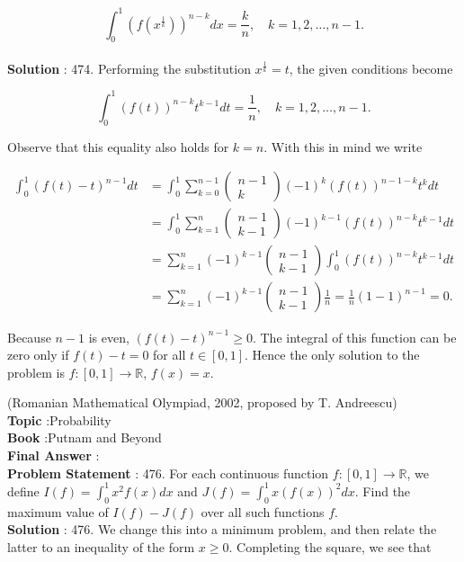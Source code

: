 \documentclass[10pt]{article}
\begin{document}
$$
\int_{0}^{1}\left(f\left(x^{\frac{1}{k}}\right)\right)^{n-k} d x=\frac{k}{n}, \quad k=1,2, \ldots, n-1 .
$$
\\
\textbf{Solution} :
474. Performing the substitution $x^{\frac{1}{k}}=t$, the given conditions become

$$
\int_{0}^{1}(f(t))^{n-k} t^{k-1} d t=\frac{1}{n}, \quad k=1,2, \ldots, n-1 .
$$

Observe that this equality also holds for $k=n$. With this in mind we write

$$
\begin{aligned}
\int_{0}^{1}(f(t)-t)^{n-1} d t &=\int_{0}^{1} \sum_{k=0}^{n-1}\left(\begin{array}{c}
n-1 \\
k
\end{array}\right)(-1)^{k}(f(t))^{n-1-k} t^{k} d t \\
&=\int_{0}^{1} \sum_{k=1}^{n}\left(\begin{array}{c}
n-1 \\
k-1
\end{array}\right)(-1)^{k-1}(f(t))^{n-k} t^{k-1} d t \\
&=\sum_{k=1}^{n}(-1)^{k-1}\left(\begin{array}{c}
n-1 \\
k-1
\end{array}\right) \int_{0}^{1}(f(t))^{n-k} t^{k-1} d t \\
&=\sum_{k=1}^{n}(-1)^{k-1}\left(\begin{array}{c}
n-1 \\
k-1
\end{array}\right) \frac{1}{n}=\frac{1}{n}(1-1)^{n-1}=0 .
\end{aligned}
$$

Because $n-1$ is even, $(f(t)-t)^{n-1} \geq 0$. The integral of this function can be zero only if $f(t)-t=0$ for all $t \in[0,1]$. Hence the only solution to the problem is $f:[0,1] \rightarrow \mathbb{R}$, $f(x)=x$.

(Romanian Mathematical Olympiad, 2002, proposed by T. Andreescu)
\\
\textbf{Topic} :Probability\\
\textbf{Book} :Putnam and Beyond\\
\textbf{Final Answer} :\\


\textbf{Problem Statement} :
476. For each continuous function $f:[0,1] \rightarrow \mathbb{R}$, we define $I(f)=\int_{0}^{1} x^{2} f(x) d x$ and $J(f)=\int_{0}^{1} x(f(x))^{2} d x$. Find the maximum value of $I(f)-J(f)$ over all such functions $f$.
\\
\textbf{Solution} :
476. We change this into a minimum problem, and then relate the latter to an inequality of the form $x \geq 0$. Completing the square, we see that
\end{document}
